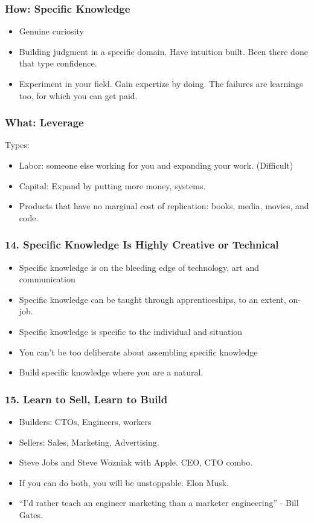 \begin{frame}[fragile]
\frametitle{How: Specific Knowledge}
\begin{itemize}
\item Genuine curiosity
\item Building judgment in a specific domain. Have intuition built. Been there done that type confidence.
\item Experiment in your field. Gain expertize by doing. The failures are learnings too, for which you can get paid.
\end{itemize}
\end{frame}

\begin{frame}[fragile]
\frametitle{What: Leverage}
Types:
\begin{itemize}
\item Labor: someone else working for you and expanding your work. (Difficult)
\item Capital: Expand by putting more money, systems.
\item Products that have no marginal cost of replication: books, media, movies, and code.
\end{itemize}
\end{frame}


\begin{frame}[fragile]
\frametitle{14. Specific Knowledge Is Highly Creative or Technical}
\begin{itemize}
\item Specific knowledge is on the bleeding edge of technology, art and communication
\item Specific knowledge can be taught through apprenticeships, to an extent, on-job.
\item Specific knowledge is specific to the individual and situation
\item You can’t be too deliberate about assembling specific knowledge
\item Build specific knowledge where you are a natural.
\end{itemize}
\end{frame}


\begin{frame}[fragile]
\frametitle{15. Learn to Sell, Learn to Build}
\begin{itemize}
\item Builders: CTOs, Engineers, workers
\item Sellers: Sales, Marketing, Advertising.
\item Steve Jobs and Steve Wozniak with Apple. CEO, CTO combo.
\item If you can do both, you will be unstoppable. Elon Musk.
\item ``I'd rather teach an engineer marketing than a marketer engineering'' - Bill Gates.
\end{itemize}
\end{frame}

